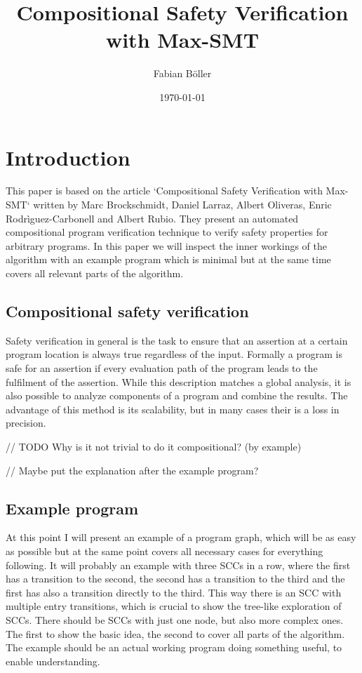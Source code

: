 \documentclass[12pt]{scrartcl}
\title{Compositional Safety Verification with Max-SMT}
\author{Fabian B\"{o}ller}
\date{\today}
\begin{document}
\maketitle

\section{Introduction}

This paper is based on the article `Compositional Safety Verification with Max-SMT` written by Marc Brockschmidt, Daniel Larraz, Albert Oliveras, Enric Rodrìguez-Carbonell and Albert Rubio.
They present an automated compositional program verification technique to verify safety properties for arbitrary programs.
In this paper we will inspect the inner workings of the algorithm with an example program which is minimal but at the same time covers all relevant parts of the algorithm.

\subsection{Compositional safety verification}

Safety verification in general is the task to ensure that an assertion at a certain program location is always true regardless of the input.
Formally a program is safe for an assertion if every evaluation path of the program leads to the fulfilment of the assertion.
While this description matches a global analysis, it is also possible to analyze components of a program and combine the results.
The advantage of this method is its scalability, but in many cases their is a loss in precision.

// TODO Why is it not trivial to do it compositional? (by example)

// Maybe put the explanation after the example program?

\subsection{Example program}

At this point I will present an example of a program graph, which will be as easy as possible but at the same point covers all necessary cases for everything following.
It will probably an example with three SCCs in a row, where the first has a transition to the second, the second has a transition to the third and the first has also a transition directly to the third.
This way there is an SCC with multiple entry transitions, which is crucial to show the tree-like exploration of SCCs.
There should be SCCs with just one node, but also more complex ones. The first to show the basic idea, the second to cover all parts of the algorithm.
The example should be an actual working program doing something useful, to enable understanding.
\end{document}
